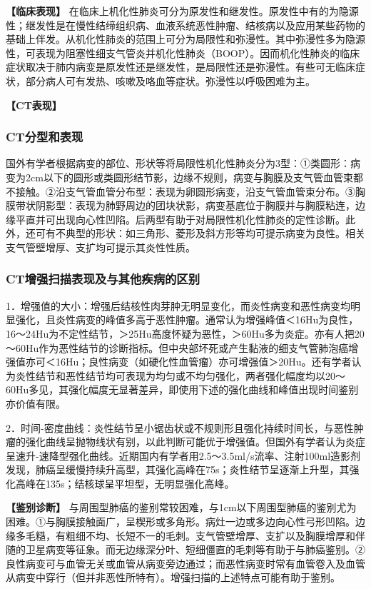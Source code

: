 \textbf{【临床表现】}
在临床上机化性肺炎可分为原发性和继发性。原发性中有的为隐源性；继发性是在慢性结缔组织病、血液系统恶性肿瘤、结核病以及应用某些药物的基础上伴发。从机化性肺炎的范围上可分为局限性和弥漫性。其中弥漫性多为隐源性，可表现为阻塞性细支气管炎并机化性肺炎（BOOP）。因而机化性肺炎的临床症状取决于肺内病变是原发性还是继发性，是局限性还是弥漫性。有些可无临床症状，部分病人可有发热、咳嗽及咯血等症状。弥漫性以呼吸困难为主。

\textbf{【CT表现】}

\subsubsection{CT分型和表现}

国外有学者根据病变的部位、形状等将局限性机化性肺炎分为3型：①类圆形：病变为2cm以下的圆形或类圆形结节影，边缘不规则，病变与胸膜及支气管血管束都不接触。②沿支气管血管分布型：表现为卵圆形病变，沿支气管血管束分布。③胸膜带状阴影型：表现为肺野周边的团块状影，病变基底位于胸膜并与胸膜粘连，边缘平直并可出现向心性凹陷。后两型有助于对局限性机化性肺炎的定性诊断。此外，还可有不典型的形状：如三角形、菱形及斜方形等均可提示病变为良性。相关支气管壁增厚、支扩均可提示其炎性性质。

\subsubsection{CT增强扫描表现及与其他疾病的区别}

1．增强值的大小：增强后结核性肉芽肿无明显变化，而炎性病变和恶性病变均明显强化，且炎性病变的峰值多高于恶性肿瘤。通常认为增强峰值＜16Hu为良性，16～24Hu为不定性结节，＞25Hu高度怀疑为恶性，＞60Hu多为炎症。亦有人把20～60Hu作为恶性结节的诊断指标。但中央部坏死或产生黏液的细支气管肺泡癌增强值亦可＜16Hu；良性病变（如硬化性血管瘤）亦可增强值＞20Hu。还有学者认为炎性结节和恶性结节均可表现为均匀或不均匀强化，两者强化幅度均以20～60Hu多见，其强化幅度无显著差异，即使用下述的强化曲线和峰值出现时间鉴别亦价值有限。

2．时间-密度曲线：炎性结节呈小锯齿状或不规则形且强化持续时间长，与恶性肿瘤的强化曲线呈抛物线状有别，以此判断可能优于增强值。但国外有学者认为炎症呈速升-速降型强化曲线。近期国内有学者用2.5～3.5ml/s流率、注射100ml造影剂发现，肺癌呈缓慢持续升高型，其强化高峰在75s；炎性结节呈逐渐上升型，其强化高峰在135s；结核球呈平坦型，无明显强化高峰。

\textbf{【鉴别诊断】}
与周围型肺癌的鉴别常较困难，与1cm以下周围型肺癌的鉴别尤为困难。①与胸膜接触面广，呈楔形或多角形。病灶一边或多边向心性弓形凹陷。边缘多毛糙，有粗细不均、长短不一的毛刺。支气管壁增厚、支扩以及胸膜增厚和伴随的卫星病变等征象。而无边缘深分叶、短细僵直的毛刺等有助于与肺癌鉴别。②良性病变可与血管无关或血管从病变旁边通过；而恶性病变时常有血管卷入及血管从病变中穿行（但并非恶性所特有）。增强扫描的上述特点可能有助于鉴别。

